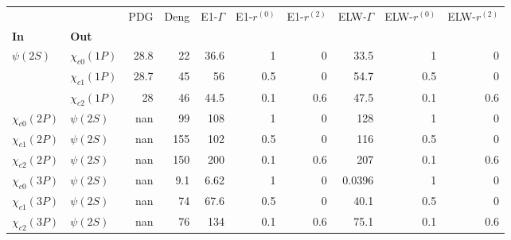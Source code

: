 \begin{tabular}{l|l|r|r|r|r|r|r|r|r}
\toprule
                &            &  PDG &  Deng &  E1-$\Gamma$ &  E1-$r^{(0)}$ &  E1-$r^{(2)}$ &  ELW-$\Gamma$ &  ELW-$r^{(0)}$ &  ELW-$r^{(2)}$ \\
\textbf{In} & \textbf{Out} &      &       &              &               &               &               &                &                \\
\midrule
\textbf{$\psi(2S)$} & \textbf{$\chi_{c0}(1P)$} & 28.8 &    22 &         36.6 &             1 &             0 &          33.5 &              1 &              0 \\
                & \textbf{$\chi_{c1}(1P)$} & 28.7 &    45 &           56 &           0.5 &             0 &          54.7 &            0.5 &              0 \\
                & \textbf{$\chi_{c2}(1P)$} &   28 &    46 &         44.5 &           0.1 &           0.6 &          47.5 &            0.1 &            0.6 \\
\textbf{$\chi_{c0}(2P)$} & \textbf{$\psi(2S)$} &  nan &    99 &          108 &             1 &             0 &           128 &              1 &              0 \\
\textbf{$\chi_{c1}(2P)$} & \textbf{$\psi(2S)$} &  nan &   155 &          102 &           0.5 &             0 &           116 &            0.5 &              0 \\
\textbf{$\chi_{c2}(2P)$} & \textbf{$\psi(2S)$} &  nan &   150 &          200 &           0.1 &           0.6 &           207 &            0.1 &            0.6 \\
\textbf{$\chi_{c0}(3P)$} & \textbf{$\psi(2S)$} &  nan &   9.1 &         6.62 &             1 &             0 &        0.0396 &              1 &              0 \\
\textbf{$\chi_{c1}(3P)$} & \textbf{$\psi(2S)$} &  nan &    74 &         67.6 &           0.5 &             0 &          40.1 &            0.5 &              0 \\
\textbf{$\chi_{c2}(3P)$} & \textbf{$\psi(2S)$} &  nan &    76 &          134 &           0.1 &           0.6 &          75.1 &            0.1 &            0.6 \\
\bottomrule
\end{tabular}
